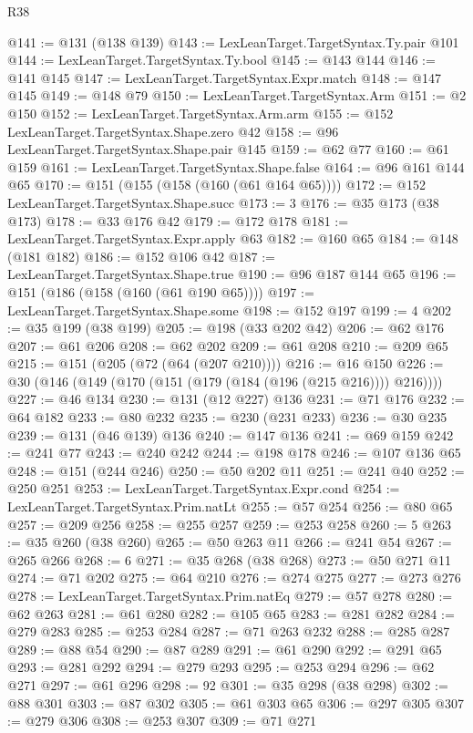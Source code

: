 \begin{lexlean}{R38}
\begin{coremodule}
@141 := @131 (@138 @139)
@143 := LexLeanTarget.TargetSyntax.Ty.pair @101
@144 := LexLeanTarget.TargetSyntax.Ty.bool
@145 := @143 @144
@146 := @141 @145
@147 := LexLeanTarget.TargetSyntax.Expr.match
@148 := @147 @145
@149 := @148 @79
@150 := LexLeanTarget.TargetSyntax.Arm
@151 := @2 @150
@152 := LexLeanTarget.TargetSyntax.Arm.arm
@155 := @152 LexLeanTarget.TargetSyntax.Shape.zero @42
@158 := @96 LexLeanTarget.TargetSyntax.Shape.pair @145
@159 := @62 @77
@160 := @61 @159
@161 := LexLeanTarget.TargetSyntax.Shape.false
@164 := @96 @161 @144 @65
@170 := @151 (@155 (@158 (@160 (@61 @164 @65))))
@172 := @152 LexLeanTarget.TargetSyntax.Shape.succ
@173 := 3
@176 := @35 @173 (@38 @173)
@178 := @33 @176 @42
@179 := @172 @178
@181 := LexLeanTarget.TargetSyntax.Expr.apply @63
@182 := @160 @65
@184 := @148 (@181 @182)
@186 := @152 @106 @42
@187 := LexLeanTarget.TargetSyntax.Shape.true
@190 := @96 @187 @144 @65
@196 := @151 (@186 (@158 (@160 (@61 @190 @65))))
@197 := LexLeanTarget.TargetSyntax.Shape.some
@198 := @152 @197
@199 := 4
@202 := @35 @199 (@38 @199)
@205 := @198 (@33 @202 @42)
@206 := @62 @176
@207 := @61 @206
@208 := @62 @202
@209 := @61 @208
@210 := @209 @65
@215 := @151 (@205 (@72 (@64 (@207 @210))))
@216 := @16 @150
@226 := @30 (@146 (@149 (@170 (@151 (@179 (@184 (@196 (@215 @216)))) @216))))
@227 := @46 @134
@230 := @131 (@12 @227) @136
@231 := @71 @176
@232 := @64 @182
@233 := @80 @232
@235 := @230 (@231 @233)
@236 := @30 @235
@239 := @131 (@46 @139) @136
@240 := @147 @136
@241 := @69 @159
@242 := @241 @77
@243 := @240 @242
@244 := @198 @178
@246 := @107 @136 @65
@248 := @151 (@244 @246)
@250 := @50 @202 @11
@251 := @241 @40
@252 := @250 @251
@253 := LexLeanTarget.TargetSyntax.Expr.cond
@254 := LexLeanTarget.TargetSyntax.Prim.natLt
@255 := @57 @254
@256 := @80 @65
@257 := @209 @256
@258 := @255 @257
@259 := @253 @258
@260 := 5
@263 := @35 @260 (@38 @260)
@265 := @50 @263 @11
@266 := @241 @54
@267 := @265 @266
@268 := 6
@271 := @35 @268 (@38 @268)
@273 := @50 @271 @11
@274 := @71 @202
@275 := @64 @210
@276 := @274 @275
@277 := @273 @276
@278 := LexLeanTarget.TargetSyntax.Prim.natEq
@279 := @57 @278
@280 := @62 @263
@281 := @61 @280
@282 := @105 @65
@283 := @281 @282
@284 := @279 @283
@285 := @253 @284
@287 := @71 @263 @232
@288 := @285 @287
@289 := @88 @54
@290 := @87 @289
@291 := @61 @290
@292 := @291 @65
@293 := @281 @292
@294 := @279 @293
@295 := @253 @294
@296 := @62 @271
@297 := @61 @296
@298 := 92
@301 := @35 @298 (@38 @298)
@302 := @88 @301
@303 := @87 @302
@305 := @61 @303 @65
@306 := @297 @305
@307 := @279 @306
@308 := @253 @307
@309 := @71 @271

\end{coremodule}
\end{lexlean}
